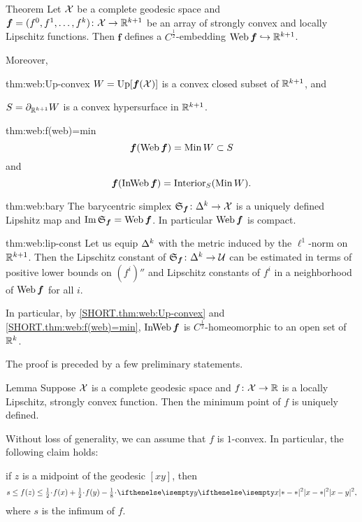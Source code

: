 \begin{thm}{Theorem}\label{thm:web}
Let $\mathcal{X}$ be a complete geodesic space 
and $\bm{f}\z=(f^0,f^1,\dots,f^\kay)\:\spc{X}\to\RR^{\kay+1}$ 
be an array of strongly convex and locally Lipschitz functions.
Then $\bm{f}$ defines a $C^{\frac12}$-embedding 
$\Web\bm{f}\hookrightarrow\RR^{\kay+1}$.

Moreover,
\begin{subthm}{thm:web:Up-convex}
$W=\mathop{\rm Up}\nolimits[\bm{f}(\mathcal{X})]$ is a convex closed subset of $\mathbb{R}^{k+1}$,
and

$S=\partial_{\mathbb{R}^{k+1}} W$ is a convex hypersurface in $\mathbb{R}^{k+1}$.
\end{subthm}

\begin{subthm}{thm:web:f(web)=min}
\[\bm{f}(\Web\bm{f})=\Min W \subset S\]
and
\[\bm{f}(\mathop{\rm InWeb}\nolimits\bm{f})= \mathop{\rm Interior}\nolimits_{S}(\mathop{\rm Min}\nolimits W).\]
\end{subthm}

\begin{subthm}{thm:web:bary}
The barycentric simplex 
$\spx{\bm{f}}\:\Delta^\kay\to \spc{X}$ is a uniquely defined Lipshitz map and $\mathop{\rm Im}\nolimits\mathfrak{S}_{\bm{f}}=\mathop{\rm Web}\nolimits\bm{f}$.
In particular $\mathop{\rm Web}\nolimits\bm{f}$ is compact.
\end{subthm}

\begin{subthm}{thm:web:lip-const}
Let us equip $\Delta^k$ with the metric induced by the $\ell^1$-norm on $\mathbb{R}^{k+1}$.
Then the Lipschitz constant of $\spx{\bm{f}}\:\Delta^\kay\to\spc{U}$ can be estimated in terms of 
positive lower bounds on $(f^i)''$ 
and Lipschitz constants of $f^i$
in a neighborhood of $\mathop{\rm Web}\nolimits\bm{f}$ for all $i$.
\end{subthm}


In particular, by \ref{SHORT.thm:web:Up-convex} and \ref{SHORT.thm:web:f(web)=min}, $\mathop{\rm InWeb}\nolimits\bm{f}$ is $C^{\frac12}$-homeomorphic to an open set of $\mathbb{R}^k$.
\end{thm}

The proof is preceded by a few preliminary statements.

\begin{thm}{Lemma}\label{lem:argmin(convex)}
Suppose $\mathcal{X}$ is a complete geodesic space and $f\:\spc{X}\to\RR$ is a locally Lipschitz, strongly convex function. Then the minimum point 
of $f$
is uniquely defined.
\end{thm}

Without loss of generality, we can assume that $f$ is $1$-convex.
In particular, the following claim holds:
\begin{clm}{}\label{midpoint}
 if $z$ is a midpoint of the geodesic $[x y]$, then 
\[s\le f(z)
\le
\tfrac{1}{2}\cdot f(x)+\tfrac{1}{2}\cdot f(y)-\tfrac{1}{8}\cdot\dist[2]{x}{y}{},
\]
where $s$ is the infimum of $f$.
\end{clm}

